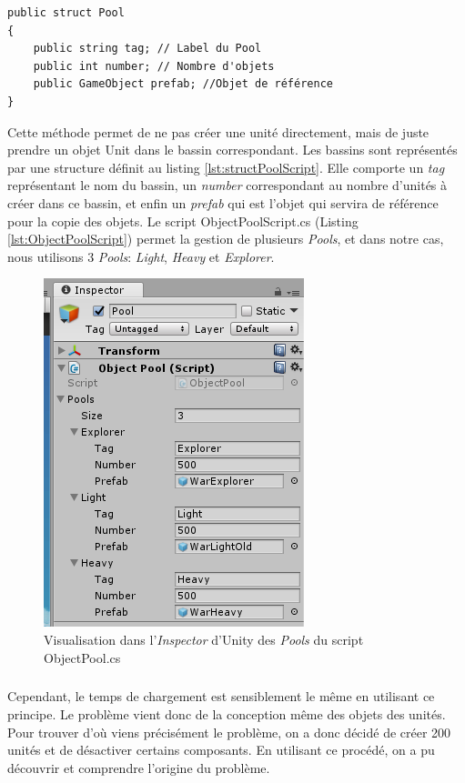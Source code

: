 \documentclass{report}
\begin{document}
 \begin{lstlisting}[language={[Sharp]C},label={lst:structPoolScript}, caption= Code de la structure \textit{Pool} de ObjectPool.cs]
public struct Pool
{
    public string tag; // Label du Pool
    public int number; // Nombre d'objets
    public GameObject prefab; //Objet de référence
}
\end{lstlisting}

Cette méthode permet de ne pas créer une unité directement, mais de juste prendre un objet Unit dans le bassin correspondant. Les bassins sont représentés par une structure définit au listing \ref{lst:structPoolScript}. Elle comporte un \textit{tag} représentant le nom du bassin, un  \textit{number} correspondant au nombre d'unités à créer dans ce bassin, et enfin un \textit{prefab} qui est l'objet qui servira de référence pour la copie des objets. Le script ObjectPoolScript.cs (Listing  \ref{lst:ObjectPoolScript}) permet la gestion de plusieurs \textit{Pools}, et dans notre cas, nous utilisons 3 \textit{Pools}:  \textit{Light},  \textit{Heavy} et  \textit{Explorer}.

\begin{figure}[!h]
\centering
\includegraphics{ObjectPoolingImage}
\caption{Visualisation dans l'\textit{Inspector} d'Unity des \textit{Pools} du script ObjectPool.cs}
\end{figure}

\subparagraph{} Cependant, le temps de chargement est sensiblement le même en utilisant ce principe. Le problème vient donc de la conception même des objets des unités. \newline
Pour trouver d’où viens précisément le problème, on a donc décidé de créer 200 unités et de désactiver certains composants. En utilisant ce procédé, on a pu découvrir et comprendre l'origine du problème.
\end{document}
